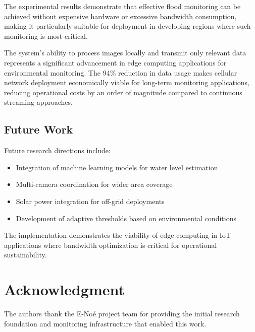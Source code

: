 \documentclass[conference]{IEEEtran}
\begin{document}
The experimental results demonstrate that effective flood monitoring can be achieved without expensive hardware or excessive bandwidth consumption, making it particularly suitable for deployment in developing regions where such monitoring is most critical.

The system's ability to process images locally and transmit only relevant data represents a significant advancement in edge computing applications for environmental monitoring. The 94\% reduction in data usage makes cellular network deployment economically viable for long-term monitoring applications, reducing operational costs by an order of magnitude compared to continuous streaming approaches.

\subsection{Future Work}

Future research directions include:
\begin{itemize}
\item Integration of machine learning models for water level estimation
\item Multi-camera coordination for wider area coverage
\item Solar power integration for off-grid deployments
\item Development of adaptive thresholds based on environmental conditions
\end{itemize}

The implementation demonstrates the viability of edge computing in IoT applications where bandwidth optimization is critical for operational sustainability.

\section*{Acknowledgment}

The authors thank the E-Noé project team for providing the initial research foundation and monitoring infrastructure that enabled this work.
\end{document}
